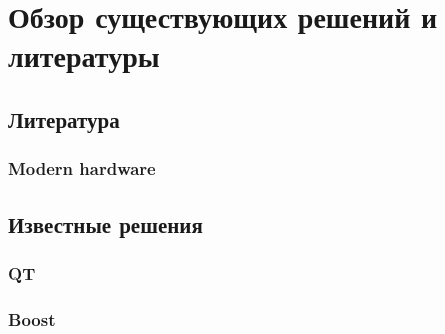\section{Обзор существующих решений и литературы}\label{literature_review}
\subsection{Литература}
\subsubsection{Modern hardware}
\subsection{Известные решения}
\subsubsection{QT}
\subsubsection{Boost}
